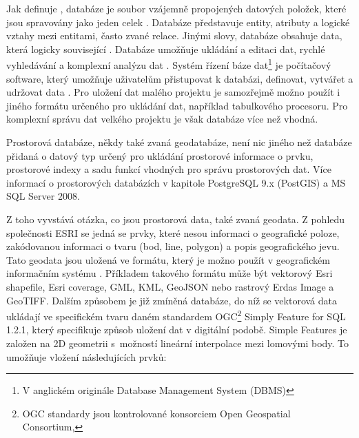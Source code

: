        Jak definuje \cite{Oppel2009}, databáze je soubor vzájemně propojených datových
        položek, které jsou spravovány jako jeden celek \citep{Oppel2009}. Databáze
        představuje entity, atributy a logické vztahy mezi entitami, často zvané
        relace. Jinými slovy, databáze obsahuje data, která logicky související
        \citep{Connolly2005}. Databáze umožňuje ukládání a editaci dat, rychlé
        vyhledávání a komplexní analýzu dat \citep{Momjian2001}. Systém řízení báze
        dat\footnote{V anglickém originále Database Management System (DBMS)} je
        počítačový software, který umožňuje uživatelům přistupovat k databázi,
        definovat, vytvářet a udržovat data \citep{Connolly2005}. Pro uložení dat
        malého projektu je samozřejmě možno použít i jiného formátu určeného pro
        ukládání dat, například tabulkového procesoru. Pro komplexní správu dat velkého
        projektu je však databáze více než vhodná. 

        Prostorová databáze, někdy také zvaná geodatabáze, není nic jiného než databáze
        přidaná o datový typ určený pro ukládání prostorové informace o prvku,
        prostorové indexy a sadu funkcí vhodných pro správu prostorových dat. Více
        informací o prostorových databázích v kapitole  PostgreSQL 9.x (PostGIS) a  MS SQL Server 2008.

        Z toho vyvstává otázka, co jsou prostorová data, také zvaná geodata. Z pohledu
        společnosti ESRI se jedná se prvky, které nesou informaci o geografické poloze,
        zakódovanou informaci o tvaru (bod, line, polygon) a popis geografického jevu.
        Tato geodata jsou uložená ve formátu, který je možno použít v geografickém
        informačním systému \citep{Esri2006}. Příkladem takového formátu může být
        vektorový Esri shapefile, Esri coverage, GML, KML, GeoJSON nebo rastrový Erdas
        Image a GeoTIFF. Dalším způsobem je již zmíněná databáze, do níž se vektorová
        data ukládají ve specifickém tvaru daném standardem OGC\footnote{OGC standardy
        jsou kontrolované konsorciem Open Geospatial Consortium, } Simply Feature for SQL 1.2.1, který
        specifikuje způsob uložení dat v digitální podobě. Simple Features je založen
        na 2D geometrii s~možností lineární interpolace mezi lomovými body. To umožňuje
        vložení následujících prvků:

